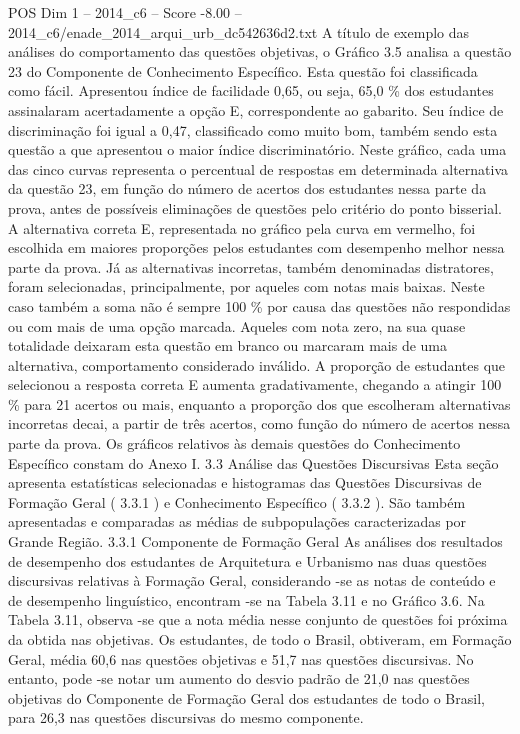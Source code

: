 \begin{textsample}{POS Dim 1 – 2014\_c6 – Score -8.00 – 2014\_c6/enade\_2014\_arqui\_urb\_dc542636d2.txt}
A título de exemplo das análises do comportamento das questões objetivas, o Gráfico 3.5 analisa a questão 23 do Componente de Conhecimento Específico.
Esta questão foi classificada como fácil.
Apresentou índice de facilidade 0,65, ou seja, 65,0 \% dos estudantes assinalaram acertadamente a opção E, correspondente ao gabarito.
Seu índice de discriminação foi igual a 0,47, classificado como muito bom, também sendo esta questão a que apresentou o maior índice discriminatório.
Neste gráfico, cada uma das cinco curvas representa o percentual de respostas em determinada alternativa da questão 23, em função do número de acertos dos estudantes nessa parte da prova, antes de possíveis eliminações de questões pelo critério do ponto bisserial.
A alternativa correta E, representada no gráfico pela curva em vermelho, foi escolhida em maiores proporções pelos estudantes com desempenho melhor nessa parte da prova.
Já as alternativas incorretas, também denominadas distratores, foram selecionadas, principalmente, por aqueles com notas mais baixas.
Neste caso também a soma não é sempre 100 \% por causa das questões não respondidas ou com mais de uma opção marcada.
Aqueles com nota zero, na sua quase totalidade deixaram esta questão em branco ou marcaram mais de uma alternativa, comportamento considerado inválido.
A proporção de estudantes que selecionou a resposta correta E aumenta gradativamente, chegando a atingir 100 \% para 21 acertos ou mais, enquanto a proporção dos que escolheram alternativas incorretas decai, a partir de três acertos, como função do número de acertos nessa parte da prova.
Os gráficos relativos às demais questões do Conhecimento Específico constam do Anexo I. 3.3 Análise das Questões Discursivas Esta seção apresenta estatísticas selecionadas e histogramas das Questões Discursivas de Formação Geral ( 3.3.1 ) e Conhecimento Específico ( 3.3.2 ).
São também apresentadas e comparadas as médias de subpopulações caracterizadas por Grande Região. 3.3.1 Componente de Formação Geral As análises dos resultados de desempenho dos estudantes de Arquitetura e Urbanismo nas duas questões discursivas relativas à Formação Geral, considerando -se as notas de conteúdo e de desempenho linguístico, encontram -se na Tabela 3.11 e no Gráfico 3.6.
Na Tabela 3.11, observa -se que a nota média nesse conjunto de questões foi próxima da obtida nas objetivas.
Os estudantes, de todo o Brasil, obtiveram, em Formação Geral, média 60,6 nas questões objetivas e 51,7 nas questões discursivas.
No entanto, pode -se notar um aumento do desvio padrão de 21,0 nas questões objetivas do Componente de Formação Geral dos estudantes de todo o Brasil, para 26,3 nas questões discursivas do mesmo componente.

\end{textsample}
